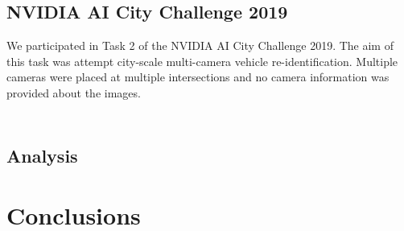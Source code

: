 \documentclass[10pt,twocolumn,letterpaper]{article}
\begin{document}
\subsection{NVIDIA AI City Challenge 2019}

We participated in Task 2 of the NVIDIA AI City Challenge 2019. The aim of this task was attempt city-scale multi-camera vehicle re-identification. Multiple cameras were placed at multiple intersections and no camera information was provided about the images.

\begin{table}
  \begin{tabular}{l || c | c}

  \end{tabular}
  \caption{}
  \label{T:aicity_results}
\end{table}

\subsection{Analysis}

\section{Conclusions}

{\small


}
\end{document}

